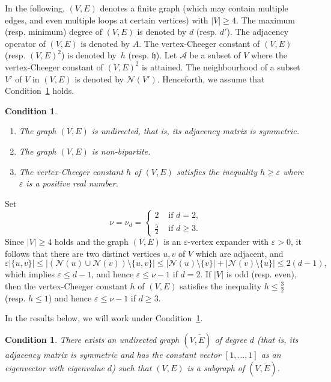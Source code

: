 \documentclass[10pt]{article}
\newtheorem{condition}[theorem]{Condition}
\theoremstyle{definition}
\newcommand{\calN}{\ensuremath{\mathcal{N}}}
\newcommand{\scrA}{\ensuremath{\mathscr{A}}}
\newcommand{\tth}{\ensuremath{\mathfrak{h}}}
\begin{document}
In the following, $(V, E)$ denotes a finite graph (which may contain multiple edges, and even multiple loops at certain vertices) with $|V| \geq 4$. The maximum (resp. minimum) degree of $(V, E)$ is denoted by $d$ (resp. $d'$). The adjacency operator of $(V, E)$ is denoted by $A$. The vertex-Cheeger constant of $(V, E)$ (resp. $(V, E)^2$) is denoted by~$h$ (resp. $\tth$). Let $\scrA$ be a subset of $V$ where the vertex-Cheeger constant of $(V, E)^2$ is attained. The neighbourhood of a subset $V'$ of $V$ in $(V, E)$ is denoted by $\calN(V')$. Henceforth, we assume that Condition~\ref{Cond:MaxDegDNonBipar} holds. 
\begin{condition}
\label{Cond:MaxDegDNonBipar}
\quad 
\begin{enumerate}
\item 
The graph $(V, E)$ is undirected, that is, its adjacency matrix is symmetric. 
\item The graph $(V, E)$ is non-bipartite. 
\item The vertex-Cheeger constant $h$ of $(V, E)$ satisfies the inequality $h\geq  \varepsilon$ where $\varepsilon$ is a positive real  number. 
\end{enumerate}
\end{condition}
Set
$$
\nu = \nu_d
= 
\begin{cases}
2 & \text{ if } d = 2, \\
\frac 52 & \text{ if } d\geq 3.
\end{cases}
$$
Since $|V|\geq 4$ holds and the graph $(V, E)$ is an $\varepsilon$-vertex expander with $\varepsilon>0$, it follows that there are two distinct vertices $u, v$ of $V$ which are adjacent, and 
$$
\varepsilon |\{u, v\}|
 \leq |(\calN(u) \cup \calN(v) ) \setminus \{u, v\}| 
 \leq |\calN(u) \setminus \{v\}| + |\calN(v)\setminus \{u\}|
 \leq 2(d-1),
$$
which implies $\varepsilon \leq d-1$, and hence $\varepsilon \leq \nu -1$ if $d = 2$. If $|V|$ is odd (resp. even), then the vertex-Cheeger constant $h$ of $(V, E)$ satisfies the inequality $h \leq \frac 32$ (resp. $h \leq 1$) and hence $\varepsilon \leq \nu -1$ if $d\geq 3$. 

In the results below, we will work under Condition~\ref{Cond:SuubgraphOfRegularGraph}. 

\begin{condition}
\label{Cond:SuubgraphOfRegularGraph}
There exists an undirected graph $(V, \widetilde E)$ of degree $d$ (that is, its adjacency matrix is symmetric and has the constant vector $[1, \ldots, 1]$ as an eigenvector with eigenvalue $d$) such that $(V, E)$ is a subgraph of $(V, \widetilde E)$. 
\end{condition}
\end{document}
